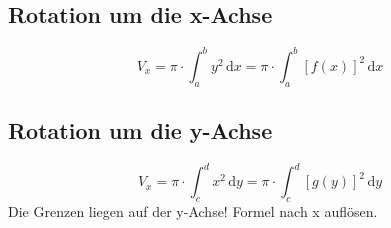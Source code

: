 \subsection{Rotation um die x-Achse} %
\label{sub:rotation_um_die_x_achse}
\[ V_x = \pi \cdot \int_a^b y^2\,\mathrm{d}x = \pi \cdot \int_a^b [f(x)]^2\,\mathrm{d}x \]
\subsection{Rotation um die y-Achse} %
\label{sub:rotation_um_die_y_achse}
\[ V_x = \pi \cdot \int_c^d x^2\,\mathrm{d}y = \pi \cdot \int_c^d [g(y)]^2\,\mathrm{d}y \]
Die Grenzen liegen auf der y-Achse! Formel nach x auflösen.

